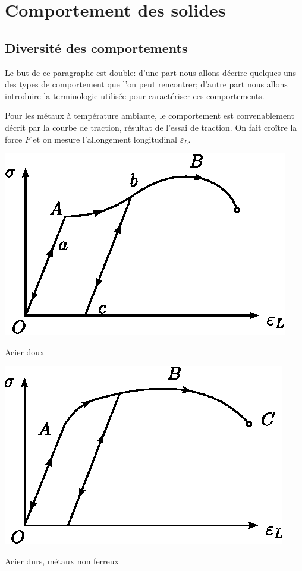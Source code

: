 \section{Comportement des solides} \label{sec:Ch04-2}
\subsection{Diversité des comportements} \label{ssec:Ch04-2.1}
Le but de ce paragraphe est double: d'une part nous allons décrire quelques uns des types de comportement que l'on peut rencontrer; d'autre part nous allons introduire la terminologie utilisée pour caractériser ces comportements.

Pour les métaux à température ambiante, le comportement est convenablement décrit par la courbe de traction, résultat de l'essai de traction.
On fait croître la force $F$ et on mesure l'allongement longitudinal $\varepsilon_L$.
\begin{multicols}{2}
    \begin{center}
        \includegraphics{../images/T1_Ch04-0011}

        Acier doux
    \end{center}
    \columnbreak
    \begin{center}
        \includegraphics{../images/T1_Ch04-0012}

        Acier durs, métaux non ferreux
    \end{center}
\end{multicols}

